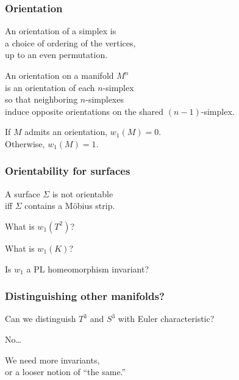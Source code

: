 \documentclass[14pt]{beamer}
\begin{document}
\begin{frame}
  \frametitle{Orientation}

  An orientation of a simplex is \\
  a choice of ordering of the vertices,\\
  up to an even permutation.

  \vfill
  \pause

  \begin{definition}
    An orientation on a manifold $M^n$ \\
    is an orientation of each $n$-simplex \\
    so that neighboring $n$-simplexes \\
    induce opposite orientations on the shared $(n-1)$-simplex.
  \end{definition}
  \vfill
  \pause

  If $M$ admits an orientation, $w_1(M) = 0$. \\
  Otherwise, $w_1(M) = 1$.

\end{frame}

\begin{frame}
  \frametitle{Orientability for surfaces}

  \begin{theorem}
    A surface $\Sigma$ is not orientable \\
    iff $\Sigma$ contains a M\"obius strip.
  \end{theorem}

  \begin{problem}
   What is $w_1(T^2)$?
 \end{problem}

  \begin{problem}
    What is $w_1(K)$?
  \end{problem}

 \begin{problem}
   Is $w_1$ a PL homeomorphism invariant?
 \end{problem}
  
\end{frame}

\begin{frame}
  \frametitle{Distinguishing other manifolds?}

  Can we distinguish $T^3$ and $S^3$ with Euler characteristic?

  \vfill
  \pause

  No\pause\ldots

  \vfill

  We need more invariants, \\
  \pause
  or a looser notion of ``the same.''
  
\end{frame}
\end{document}
